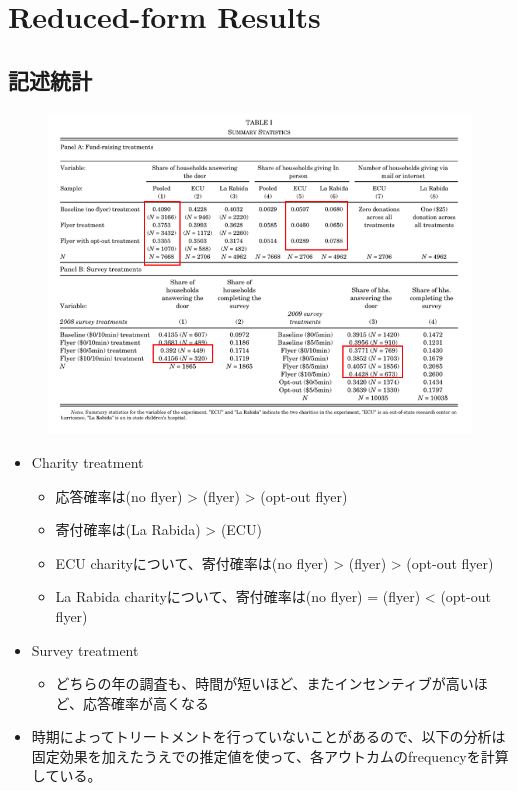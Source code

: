 \documentclass[../root]{subfiles}
\begin{document}
    

    \clearpage
    \section{Reduced-form Results}

    \subsection{記述統計}

    \begin{figure}[h]
        \centering
        \includegraphics[width = .8\linewidth]{0821kato/fig4_2.png}
        \label{}
    \end{figure}

    \begin{itemize}
        \item Charity treatment
        \begin{itemize}
            \item 応答確率は(no flyer) > (flyer) > (opt-out flyer)
            \item 寄付確率は(La Rabida) > (ECU)
            \item ECU charityについて、寄付確率は(no flyer) > (flyer) > (opt-out flyer)
            \item La Rabida charityについて、寄付確率は(no flyer) = (flyer) < (opt-out flyer)
        \end{itemize}
        \item Survey treatment
        \begin{itemize}
            \item どちらの年の調査も、時間が短いほど、またインセンティブが高いほど、応答確率が高くなる
        \end{itemize}
        \item 時期によってトリートメントを行っていないことがあるので、以下の分析は固定効果を加えたうえでの推定値を使って、各アウトカムのfrequencyを計算している。
    \end{itemize}
\end{document}
